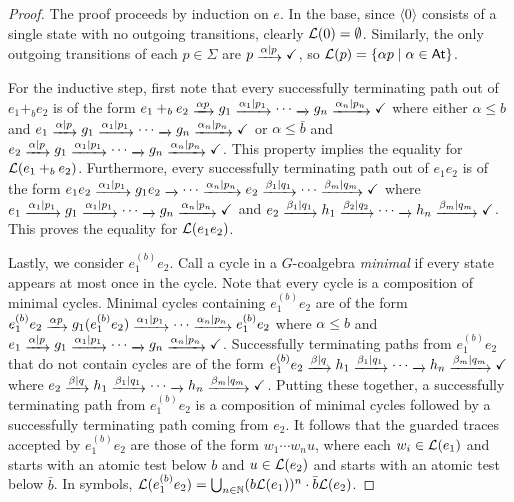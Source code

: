 \documentclass[orivec,envcountsect,envcountsame]{llncs}
\begin{document}
\begin{proof}
    The proof proceeds by induction on $e$.
    In the base, since \(\langle 0\rangle\) consists of a single state with no outgoing transitions, clearly \(\mathcal{L}(0) = \emptyset\).
	Similarly, the only outgoing transitions of each \(p \in \Sigma\) are \(p \tr{\alpha \mid p} \checkmark\), so \(\mathcal{L}(p) = \{\alpha p \mid \alpha \in \mathsf{At}\}\).

    For the inductive step, first note that every successfully terminating path out of \(e_1 +_b e_2\) is of the form
	\(
	e_1 +_b e_2 \tr{\alpha p} g_1 \tr{\alpha_1 \mid p_1} \cdots \tr{} g_n \tr{\alpha_n \mid p_n} \checkmark
	\)
	where either \(\alpha \le b\) and
	\(
	e_1\tr{\alpha \mid p} g_1 \tr{\alpha_1 \mid p_1} \cdots \tr{} g_n \tr{\alpha_n \mid p_n} \checkmark
	\)
	or \(\alpha \le \bar b\) and
	\(
	e_2\tr{\alpha \mid p} g_1 \tr{\alpha_1 \mid p_1} \cdots \tr{} g_n \tr{\alpha_n \mid p_n} \checkmark
	\).
    This property implies the equality for $\mathcal{L}(e_1 +_b e_2)$.
    Furthermore, every successfully terminating path out of \(e_1e_2\) is of the form
	\(
	e_1e_2 \tr{\alpha_1\mid p_1} g_1e_2 \tr{} \cdots \tr{\alpha_n \mid p_n} e_2 \tr{\beta_1\mid q_1} \cdots \tr{\beta_m \mid q_m} \checkmark
	\)
	where
	\(
	e_1\tr{\alpha_1 \mid p_1} g_1 \tr{\alpha_1 \mid p_1} \cdots \tr{} g_n \tr{\alpha_n \mid p_n} \checkmark
	\)
	and
	\(
	e_2\tr{\beta_1 \mid q_1} h_1 \tr{\beta_2 \mid q_2} \cdots \tr{} h_n \tr{\beta_m \mid q_m} \checkmark
	\).
    This proves the equality for $\mathcal{L}(e_1 e_2)$.

	Lastly, we consider \(e_1^{(b)} e_2\).
	Call a cycle in a \(G\)-coalgebra \emph{minimal} if every state appears at most once in the cycle.
	Note that every cycle is a composition of minimal cycles.
	Minimal cycles containing \(e_1^{(b)} e_2\) are of the form
	\(
	e_1 ^{(b)} e_2 \tr{\alpha p} g_1(e_1 ^{(b)} e_2) \tr{\alpha_1 \mid p_1} \cdots \tr{\alpha_n\mid p_n} e_1 ^{(b)} e_2
	\)
	where \(\alpha \le b\) and
	\(
	e_1\tr{\alpha \mid p} g_1 \tr{\alpha_1 \mid p_1} \cdots \tr{} g_n \tr{\alpha_n \mid p_n} \checkmark
	\).
	Successfully terminating paths from \(e_1^{(b)}e_2\) that do not contain cycles are of the form
	\(
	e_1^{(b)}e_2 \tr{\beta \mid q} h_1 \tr{\beta_1 \mid q_1} \cdots \tr{} h_n \tr{\beta_m \mid q_m} \checkmark
	\)
	where
	\(
	e_2 \tr{\beta \mid q} h_1 \tr{\beta_1 \mid q_1} \cdots \tr{} h_n \tr{\beta_m \mid q_m} \checkmark
	\).
	Putting these together, a successfully terminating path from \(e_1^{(b)}e_2\) is a composition of minimal cycles followed by a successfully terminating path coming from \(e_2\).
	It follows that the guarded traces accepted by \(e_1^{(b)}e_2\) are those of the form \(w_1\cdots w_n u\), where each \(w_i \in \mathcal{L}(e_1)\) and starts with an atomic test below \(b\) and \(u \in \mathcal{L}(e_2)\) and starts with an atomic test below \(\bar b\).
	In symbols, \(\mathcal{L}(e_1^{(b)}e_2) = \bigcup_{n \in \mathbb N} (b \mathcal{L}(e_1))^n\cdot \bar b \mathcal{L}(e_2)\).
\end{proof}
\end{document}
